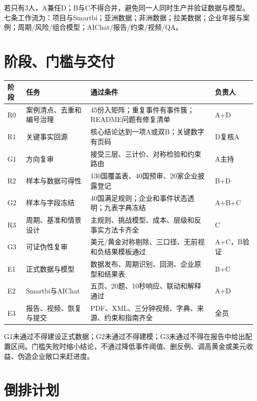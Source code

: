 \documentclass[UTF8,fontset=windows,12pt,openany]{ctexbook}
\begin{document}
若只有3人，A兼任D；B与C不得合并，避免同一人同时生产并验证数据与模型。七条工作流为：项目与Smartbi；亚洲数据；非洲数据；拉美数据；企业年报与案例；周期/风险/组合模型；AIChat/报告/约束/视频/QA。

\chapter{阶段、门槛与交付}

\begin{longtable}{p{1.3cm}p{3.4cm}p{6.0cm}p{2.6cm}}
\toprule
\textbf{阶段} & \textbf{任务} & \textbf{通过条件} & \textbf{负责人}\\
\midrule
R0 & 案例清点、去重和编号治理 & 45份入矩阵；重复事件有事件簇；README问题有修复清单 & A+D\\
R1 & 关键事实回源 & 核心结论达到一项A或双B；关键数字有页码 & D复核A\\
G1 & 方向复审 & 接受三层、三计价、对称检验和约束路由 & A主持\\
R2 & 样本与数据可得性 & 130国覆盖表、40国预审、20家企业披露登记 & B+D\\
G2 & 样本与字段冻结 & 40国满足规则；企业和事件状态透明；九表字典冻结 & A+B+C\\
R3 & 周期、基准和情景设计 & 主规则、挑战模型、成本、层级和反事实方法卡齐全 & C\\
G3 & 可证伪性复审 & 美元/黄金对称剔除、三口径、无前视和负结果模板通过 & A+C，B验证\\
E1 & 正式数据与模型 & 数据发布、周期识别、回测、企业原型和结果表 & B+C\\
E2 & Smartbi与AIChat & 五页、20题、10秒响应、联动和解释通过 & A+D\\
E3 & 报告、视频、恢复与提交 & PDF、XML、三分钟视频、字典、来源、约束和指南齐全 & 全员\\
\bottomrule
\end{longtable}

G1未通过不得建设正式数据；G2未通过不得建模；G3未通过不得在报告中给出配置区间。门槛失败时缩小结论，不通过降低事件阈值、删反例、调高黄金或美元收益、伪造企业敞口来赶进度。

\chapter{倒排计划}
\end{document}
